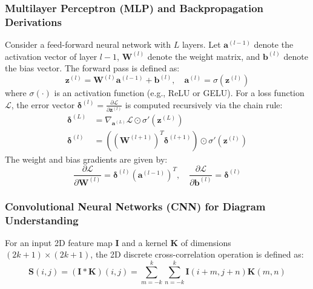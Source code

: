 \subsubsection{Multilayer Perceptron (MLP) and Backpropagation Derivations}
Consider a feed-forward neural network with $L$ layers. Let $\mathbf{a}^{(l-1)}$ denote the activation vector of layer $l-1$, $\mathbf{W}^{(l)}$ denote the weight matrix, and $\mathbf{b}^{(l)}$ denote the bias vector. The forward pass is defined as:
\begin{equation}
    \mathbf{z}^{(l)} = \mathbf{W}^{(l)} \mathbf{a}^{(l-1)} + \mathbf{b}^{(l)}, \quad \mathbf{a}^{(l)} = \sigma\left(\mathbf{z}^{(l)}\right)
\end{equation}
where $\sigma(\cdot)$ is an activation function (e.g., ReLU or GELU). For a loss function $\mathcal{L}$, the error vector $\boldsymbol{\delta}^{(l)} = \frac{\partial \mathcal{L}}{\partial \mathbf{z}^{(l)}}$ is computed recursively via the chain rule:
\begin{align}
    \boldsymbol{\delta}^{(L)} &= \nabla_{\mathbf{a}^{(L)}} \mathcal{L} \odot \sigma'\left(\mathbf{z}^{(L)}\right) \\
    \boldsymbol{\delta}^{(l)} &= \left( (\mathbf{W}^{(l+1)})^T \boldsymbol{\delta}^{(l+1)} \right) \odot \sigma'\left(\mathbf{z}^{(l)}\right)
\end{align}
The weight and bias gradients are given by:
\begin{equation}
    \frac{\partial \mathcal{L}}{\partial \mathbf{W}^{(l)}} = \boldsymbol{\delta}^{(l)} (\mathbf{a}^{(l-1)})^T, \quad \frac{\partial \mathcal{L}}{\partial \mathbf{b}^{(l)}} = \boldsymbol{\delta}^{(l)}
\end{equation}

\subsubsection{Convolutional Neural Networks (CNN) for Diagram Understanding}
For an input 2D feature map $\mathbf{I}$ and a kernel $\mathbf{K}$ of dimensions $(2k+1) \times (2k+1)$, the 2D discrete cross-correlation operation is defined as:
\begin{equation}
    \mathbf{S}(i, j) = (\mathbf{I} * \mathbf{K})(i, j) = \sum_{m=-k}^k \sum_{n=-k}^k \mathbf{I}(i+m, j+n) \mathbf{K}(m, n)
\end{equation}

